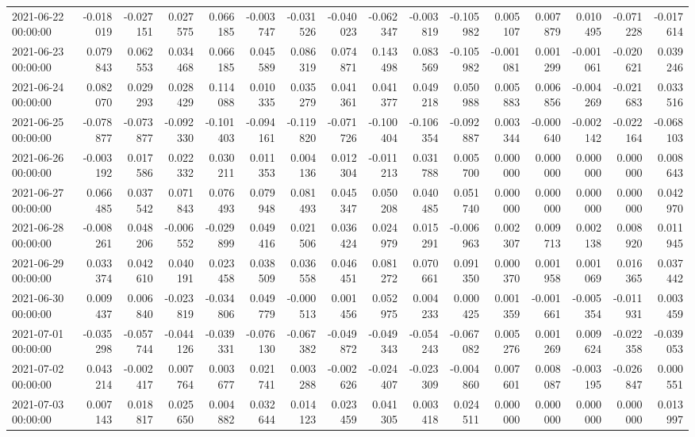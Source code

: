 \begin{tabular}{lrrrrrrrrrrrrrrr}
2021-06-22 00:00:00 & -0.018019 & -0.027151 & 0.027575 & 0.066185 & -0.003747 & -0.031526 & -0.040023 & -0.062347 & -0.003819 & -0.105982 & 0.005107 & 0.007879 & 0.010495 & -0.071228 & -0.017614 \\
2021-06-23 00:00:00 & 0.079843 & 0.062553 & 0.034468 & 0.066185 & 0.045589 & 0.086319 & 0.074871 & 0.143498 & 0.083569 & -0.105982 & -0.001081 & 0.001299 & -0.001061 & -0.020621 & 0.039246 \\
2021-06-24 00:00:00 & 0.082070 & 0.029293 & 0.028429 & 0.114088 & 0.010335 & 0.035279 & 0.041361 & 0.041377 & 0.049218 & 0.050988 & 0.005883 & 0.006856 & -0.004269 & -0.021683 & 0.033516 \\
2021-06-25 00:00:00 & -0.078877 & -0.073877 & -0.092330 & -0.101403 & -0.094161 & -0.119820 & -0.071726 & -0.100404 & -0.106354 & -0.092887 & 0.003344 & -0.000640 & -0.002142 & -0.022164 & -0.068103 \\
2021-06-26 00:00:00 & -0.003192 & 0.017586 & 0.022332 & 0.030211 & 0.011353 & 0.004136 & 0.012304 & -0.011213 & 0.031788 & 0.005700 & 0.000000 & 0.000000 & 0.000000 & 0.000000 & 0.008643 \\
2021-06-27 00:00:00 & 0.066485 & 0.037542 & 0.071843 & 0.076493 & 0.079948 & 0.081493 & 0.045347 & 0.050208 & 0.040485 & 0.051740 & 0.000000 & 0.000000 & 0.000000 & 0.000000 & 0.042970 \\
2021-06-28 00:00:00 & -0.008261 & 0.048206 & -0.006552 & -0.029899 & 0.049416 & 0.021506 & 0.036424 & 0.024979 & 0.015291 & -0.006963 & 0.002307 & 0.009713 & 0.002138 & 0.008920 & 0.011945 \\
2021-06-29 00:00:00 & 0.033374 & 0.042610 & 0.040191 & 0.023458 & 0.038509 & 0.036558 & 0.046451 & 0.081272 & 0.070661 & 0.091350 & 0.000370 & 0.001958 & 0.001069 & 0.016365 & 0.037442 \\
2021-06-30 00:00:00 & 0.009437 & 0.006840 & -0.023819 & -0.034806 & 0.049779 & -0.000513 & 0.001456 & 0.052975 & 0.004233 & 0.000425 & 0.001359 & -0.001661 & -0.005354 & -0.011931 & 0.003459 \\
2021-07-01 00:00:00 & -0.035298 & -0.057744 & -0.044126 & -0.039331 & -0.076130 & -0.067382 & -0.049872 & -0.049343 & -0.054243 & -0.067082 & 0.005276 & 0.001269 & 0.009624 & -0.022358 & -0.039053 \\
2021-07-02 00:00:00 & 0.043214 & -0.002417 & 0.007764 & 0.003677 & 0.021741 & 0.003288 & -0.002626 & -0.024407 & -0.023309 & -0.004860 & 0.007601 & 0.008087 & -0.003195 & -0.026847 & 0.000551 \\
2021-07-03 00:00:00 & 0.007143 & 0.018817 & 0.025650 & 0.004882 & 0.032644 & 0.014123 & 0.023459 & 0.041305 & 0.003418 & 0.024511 & 0.000000 & 0.000000 & 0.000000 & 0.000000 & 0.013997 \\

\end{tabular}
